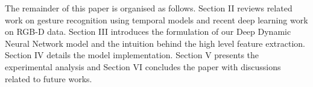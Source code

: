 The remainder of this paper is organised as follows. Section II reviews related work on gesture recognition using temporal models and recent deep learning work on RGB-D data. Section III introduces the formulation of our Deep Dynamic Neural Network model and the intuition behind the high level feature extraction. Section IV details the model implementation. Section V presents the experimental analysis and Section VI concludes the paper with discussions related to future works.


\endinput
